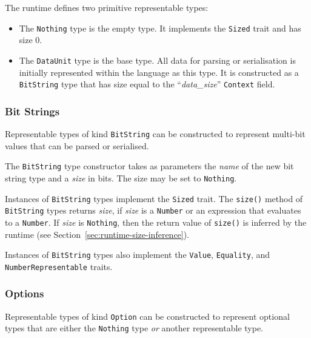 \documentclass[10pt,twocolumn,a4paper]{article}
\newcommand{\code}[1]{\texttt{#1}}
\begin{document}
The runtime defines two primitive representable types:

\begin{itemize}
  \item The \code{Nothing} type is the empty type. It implements the
    \code{Sized} trait and has size 0.

  \item The \code{DataUnit} type is the base type. All data for parsing or
    serialisation is initially represented within the language as this type.
    It is constructed as a \code{BitString} type that has size equal to the
    ``\emph{data\_size}'' \code{Context} field.
\end{itemize}

\subsubsection{Bit Strings}
\label{sec:bit-string}

Representable types of kind \code{BitString} can be constructed to
represent multi-bit values that can be parsed or serialised.

The \code{BitString} type constructor takes as parameters the \emph{name}
of the new bit string type and a \emph{size} in bits. The size may be
set to \code{Nothing}.

Instances of \code{BitString} types implement the \code{Sized} trait. The
\code{size()} method of \code{BitString} types returns \emph{size}, if
\emph{size} is a \code{Number} or an expression that evaluates to a
\code{Number}. If \emph{size} is \code{Nothing}, then the return value of
\code{size()} is inferred by the runtime (see
Section~\ref{sec:runtime-size-inference}).

Instances of \code{BitString} types also implement the \code{Value},
\code{Equality}, and \code{NumberRepresentable} traits.

\subsubsection{Options}
\label{sec:option-type}

Representable types of kind \code{Option} can be constructed to represent
optional types that are either the \code{Nothing} type \emph{or} another
representable type.
\end{document}
